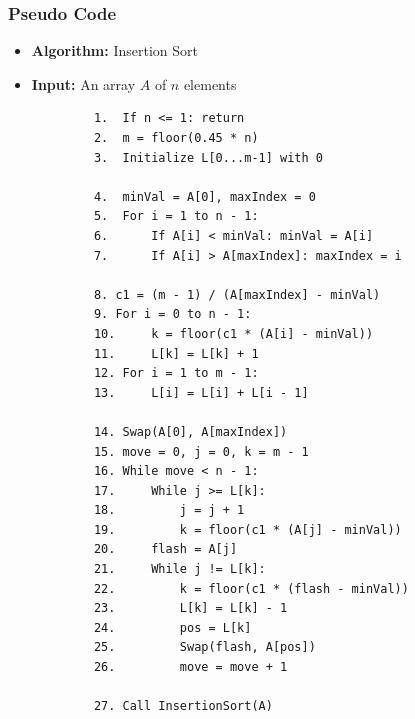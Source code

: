     \subsubsection{Pseudo Code}
        \begin{itemize}
            \item \textbf{Algorithm:} Insertion Sort
            \item \textbf{Input:} An array $A$ of $n$ elements
        \end{itemize}
        \begin{verbatim}
            1.  If n <= 1: return
            2.  m = floor(0.45 * n)
            3.  Initialize L[0...m-1] with 0

            4.  minVal = A[0], maxIndex = 0
            5.  For i = 1 to n - 1:
            6.      If A[i] < minVal: minVal = A[i]
            7.      If A[i] > A[maxIndex]: maxIndex = i

            8. c1 = (m - 1) / (A[maxIndex] - minVal)
            9. For i = 0 to n - 1:
            10.     k = floor(c1 * (A[i] - minVal))
            11.     L[k] = L[k] + 1
            12. For i = 1 to m - 1:
            13.     L[i] = L[i] + L[i - 1]

            14. Swap(A[0], A[maxIndex])
            15. move = 0, j = 0, k = m - 1
            16. While move < n - 1:
            17.     While j >= L[k]:
            18.         j = j + 1
            19.         k = floor(c1 * (A[j] - minVal))
            20.     flash = A[j]
            21.     While j != L[k]:
            22.         k = floor(c1 * (flash - minVal))
            23.         L[k] = L[k] - 1
            24.         pos = L[k]
            25.         Swap(flash, A[pos])
            26.         move = move + 1

            27. Call InsertionSort(A)
        \end{verbatim}
